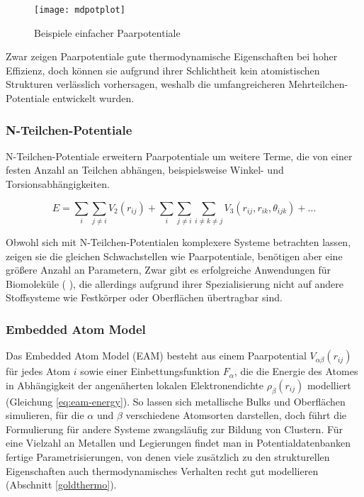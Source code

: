 \begin{figure}
  \centering
  \texttt{[image: mdpotplot]}
  \caption{Beispiele einfacher Paarpotentiale}
  \label{fig:mdpairpotentials}
\end{figure}

Zwar zeigen Paarpotentiale gute thermodynamische Eigenschaften bei hoher Effizienz, doch können sie aufgrund ihrer Schlichtheit kein atomistischen Strukturen verlässlich vorhersagen, weshalb die umfangreicheren Mehrteilchen-Potentiale entwickelt wurden.

\subsubsection{N-Teilchen-Potentiale}

N-Teilchen-Potentiale erweitern Paarpotentiale um weitere Terme, die von einer festen Anzahl an Teilchen abhängen, beispielsweise Winkel- und Torsionsabhängigkeiten.

\begin{equation}
  \label{eq:nbody-energy}
  E = \sum_i\sum_{j \neq i}{V_2\left(r_{ij}\right)} + \sum_i\sum_{j \neq i}\sum_{i \neq k \neq j}{V_3\left(r_{ij}, r_{ik}, \theta_{ijk}\right)} + \dots
\end{equation}

Obwohl sich mit N-Teilchen-Potentialen komplexere Systeme betrachten lassen, zeigen sie die gleichen Schwachstellen wie Paarpotentiale, benötigen aber eine größere Anzahl an Parametern,
Zwar gibt es erfolgreiche  Anwendungen für Biomoleküle (  ), die allerdings aufgrund ihrer Spezialisierung nicht auf andere Stoffsysteme wie Festkörper oder Oberflächen übertragbar sind.

\subsubsection{Embedded Atom Model}

Das Embedded Atom Model (EAM) besteht aus einem Paarpotential $V_{\alpha\beta}(r_{ij})$ für jedes Atom $i$ sowie einer Einbettungsfunktion $F_\alpha$, die die Energie des Atomes in Abhängigkeit der angenäherten lokalen Elektronendichte $\rho_\beta(r_{ij})$ modelliert (Gleichung \ref{eq:eam-energy}).
So lassen sich metallische Bulks und Oberflächen simulieren, für die $\alpha$ und $\beta$ verschiedene Atomsorten darstellen, doch führt die Formulierung für andere Systeme zwangsläufig zur Bildung von Clustern.
Für eine Vielzahl an Metallen und Legierungen findet man in Potentialdatenbanken fertige Parametrisierungen, von denen viele zusätzlich zu den strukturellen Eigenschaften auch thermodynamisches Verhalten recht gut modellieren (Abschnitt \ref{goldthermo}).

